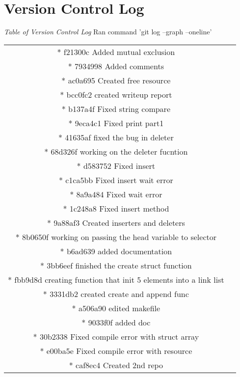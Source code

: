 \documentclass{article}
\begin{document}
\section*{Version Control Log}
\textit{Table of Version Control Log} Ran command 'git log --graph --oneline'
\newline
\begin{center}
\begin{tabular}{ c c }
* f21300c Added mutual exclusion \\
* 7934998 Added comments \\
* ac0a695 Created free resource \\
* bcc0fc2 created writeup report \\
* b137a4f Fixed string compare \\
* 9eca4c1 Fixed print part1 \\
* 41635af fixed the bug in deleter \\
* 68d326f working on the deleter fucntion \\
* d583752 Fixed insert \\
* c1ca5bb Fixed insert wait error \\
* 8a9a484 Fixed wait error \\
* 1c248a8 Fixed insert method \\
* 9a88af3 Created inserters and deleters \\
* 8b0650f working on passing the head variable to selector \\
* b6ad639 added documentation \\
* 3bb6eef finished the create struct function \\
* fbb9d8d creating function that init 5 elements into a link list \\
* 3331db2 created create and append func \\
* a506a90 edited makefile \\
* 9033f0f added doc \\
* 30b2338 Fixed compile error with struct array \\
* e00ba5e Fixed compile error with resource \\
* caf8ec4 Created 2nd repo

\end{tabular}
\end{center}

\end{document}

